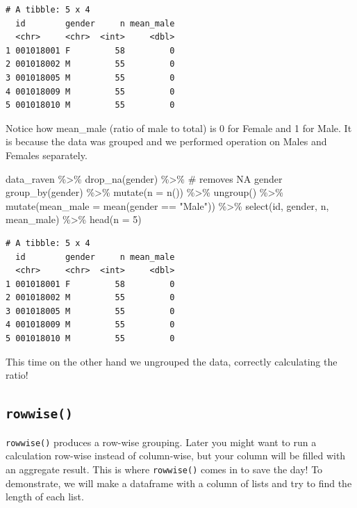 \documentclass[
  letterpaper,
]{book}
\newenvironment{Shaded}{\begin{snugshade}}{\end{snugshade}}
\newcommand{\AttributeTok}[1]{\textcolor[rgb]{0.40,0.45,0.13}{#1}}
\newcommand{\CommentTok}[1]{\textcolor[rgb]{0.37,0.37,0.37}{#1}}
\newcommand{\DecValTok}[1]{\textcolor[rgb]{0.68,0.00,0.00}{#1}}
\newcommand{\FunctionTok}[1]{\textcolor[rgb]{0.28,0.35,0.67}{#1}}
\newcommand{\NormalTok}[1]{\textcolor[rgb]{0.00,0.23,0.31}{#1}}
\newcommand{\SpecialCharTok}[1]{\textcolor[rgb]{0.37,0.37,0.37}{#1}}
\newcommand{\StringTok}[1]{\textcolor[rgb]{0.13,0.47,0.30}{#1}}
\begin{document}
\begin{verbatim}
# A tibble: 5 x 4
  id        gender     n mean_male
  <chr>     <chr>  <int>     <dbl>
1 001018001 F         58         0
2 001018002 M         55         0
3 001018005 M         55         0
4 001018009 M         55         0
5 001018010 M         55         0
\end{verbatim}

Notice how mean\_male (ratio of male to total) is 0 for Female and 1 for
Male. It is because the data was grouped and we performed operation on
Males and Females separately.

\begin{Shaded}
\begin{Highlighting}[]
\NormalTok{data\_raven }\SpecialCharTok{\%\textgreater{}\%}
  \FunctionTok{drop\_na}\NormalTok{(gender) }\SpecialCharTok{\%\textgreater{}\%}  \CommentTok{\# removes NA gender}
  \FunctionTok{group\_by}\NormalTok{(gender) }\SpecialCharTok{\%\textgreater{}\%} 
  \FunctionTok{mutate}\NormalTok{(}\AttributeTok{n =} \FunctionTok{n}\NormalTok{()) }\SpecialCharTok{\%\textgreater{}\%}
  \FunctionTok{ungroup}\NormalTok{() }\SpecialCharTok{\%\textgreater{}\%}
  \FunctionTok{mutate}\NormalTok{(}\AttributeTok{mean\_male =} \FunctionTok{mean}\NormalTok{(gender }\SpecialCharTok{==} \StringTok{"Male"}\NormalTok{)) }\SpecialCharTok{\%\textgreater{}\%}
  \FunctionTok{select}\NormalTok{(id, gender, n, mean\_male) }\SpecialCharTok{\%\textgreater{}\%} \FunctionTok{head}\NormalTok{(}\AttributeTok{n =} \DecValTok{5}\NormalTok{)}
\end{Highlighting}
\end{Shaded}

\begin{verbatim}
# A tibble: 5 x 4
  id        gender     n mean_male
  <chr>     <chr>  <int>     <dbl>
1 001018001 F         58         0
2 001018002 M         55         0
3 001018005 M         55         0
4 001018009 M         55         0
5 001018010 M         55         0
\end{verbatim}

This time on the other hand we ungrouped the data, correctly calculating
the ratio!

\hypertarget{rowwise}{%
\subsection{\texorpdfstring{\texttt{rowwise()}}{rowwise()}}\label{rowwise}}

\texttt{rowwise()} produces a row-wise grouping. Later you might want to
run a calculation row-wise instead of column-wise, but your column will
be filled with an aggregate result. This is where \texttt{rowwise()}
comes in to save the day! To demonstrate, we will make a dataframe with
a column of lists and try to find the length of each list.
\end{document}
